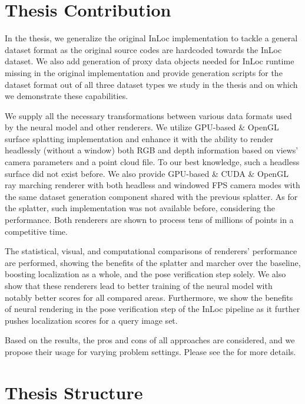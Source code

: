 \section*{Thesis Contribution}

In the thesis, we generalize the original InLoc implementation to tackle a general dataset
format as the original source codes are hardcoded towards the InLoc dataset. We also add
generation of proxy data objects needed for InLoc runtime missing in the original
implementation and provide generation scripts for the dataset format out of all
three dataset types we study in the thesis and on which we demonstrate these capabilities.

We supply all the necessary transformations between various data formats
used by the neural model and other renderers. We utilize GPU-based
\CC{} \& OpenGL surface splatting implementation and enhance it with the ability to render headlessly
(without a window) both RGB and depth information based on views' camera parameters and a point
cloud file. To our best knowledge, such a headless surface  did not exist before.
We also provide GPU-based \CC{} \& CUDA \& OpenGL ray marching renderer with both headless and windowed
FPS camera modes with the same dataset generation component shared with the previous
splatter. As for the splatter, such implementation was not available before, considering
the performance. Both \CC{} renderers are shown to process tens of millions
of points in a competitive time.

The statistical, visual, and computational comparisons of renderers' performance are performed,
showing the benefits of the splatter and marcher over the baseline, boosting localization
as a whole, and the pose verification step solely. We also show that these renderers
lead to better training of the neural model with notably better scores for all compared
areas. Furthermore, we show the benefits of neural rendering in the pose verification step
of the InLoc pipeline as it further pushes localization scores for a query image set.

Based on the results, the pros and cons of all approaches are considered, and we propose
their usage for varying problem settings. Please see the  for more details.

\section*{Thesis Structure}

